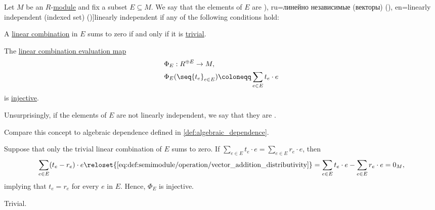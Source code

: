 \begin{definition}\label{def:linear_dependence}
  Let \( M \) be an \( R \)-\hyperref[def:module]{module} and fix a subset \( E \subseteq M \). We say that the elements of \( E \) are \term[bg=линейно независими (вектори) (\cite[94]{Обрешков1962ВисшаАлгебра}), ru=линейно независимые (векторы) (\cite[\S 3.4]{Тыртышников2007ЛинейнаяАлгебра}), en=linearly independent (indexed set) (\cite[def. VI.1.1]{Aluffi2009Algebra})]{linearly independent} if any of the following conditions hold:

  \begin{thmenum}
     A \hyperref[def:linear_combination]{linear combination} in \( E \) sums to zero if and only if it is \hyperref[def:free_semimodule]{trivial}.

     The \hyperref[thm:free_semimodule_universal_property]{linear combination evaluation map}
    \begin{equation*}
      \begin{aligned}
        &\Phi_E: R^{\oplus E} \to M, \\
        &\Phi_E( \seq{ t_e }_{e \in E} ) \coloneqq \sum_{e \in E} t_e \cdot e
      \end{aligned}
    \end{equation*}
    is \hyperref[def:function_invertibility/injective]{injective}.
  \end{thmenum}

  Unsurprisingly, if the elements of \( E \) are not linearly independent, we say that they are .
\end{definition}
\begin{comments}
  \item Compare this concept to algebraic dependence defined in \cref{def:algebraic_dependence}.
\end{comments}
\begin{defproof}
   Suppose that only the trivial linear combination of \( E \) sums to zero. If \( \sum_{e \in E} t_e \cdot e = \sum_{e \in E} r_e \cdot e \), then
  \begin{equation*}
    \sum_{e \in E} (t_e - r_e) \cdot e
    \reloset {\eqref{eq:def:semimodule/operation/vector_addition_distributivity}} =
    \sum_{e \in E} t_e \cdot e - \sum_{e \in E} r_e \cdot e
    =
    0_M,
  \end{equation*}
  implying that \( t_e = r_e \) for every \( e \) in \( E \). Hence, \( \Phi_E \) is injective.

   Trivial.
\end{defproof}

